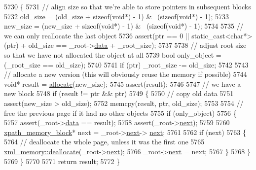 \begin{DoxyCode}
5730         \{
5731             \textcolor{comment}{// align size so that we're able to store pointers in subsequent blocks}
5732             old\_size = (old\_size + \textcolor{keyword}{sizeof}(\textcolor{keywordtype}{void}*) - 1) & ~(\textcolor{keyword}{sizeof}(\textcolor{keywordtype}{void}*) - 1);
5733             new\_size = (new\_size + \textcolor{keyword}{sizeof}(\textcolor{keywordtype}{void}*) - 1) & ~(\textcolor{keyword}{sizeof}(\textcolor{keywordtype}{void}*) - 1);
5734 
5735             \textcolor{comment}{// we can only reallocate the last object}
5736             assert(ptr == 0 || static\_cast<char*>(ptr) + old\_size == \_root->\hyperlink{structxpath__memory__block_a7b00376d0eac172ab537b6b0964858a9}{data} + \_root\_size);
5737 
5738             \textcolor{comment}{// adjust root size so that we have not allocated the object at all}
5739             \textcolor{keywordtype}{bool} only\_object = (\_root\_size == old\_size);
5740 
5741             \textcolor{keywordflow}{if} (ptr) \_root\_size -= old\_size;
5742 
5743             \textcolor{comment}{// allocate a new version (this will obviously reuse the memory if possible)}
5744             \textcolor{keywordtype}{void}* result = \hyperlink{classxpath__allocator_aad95aa445f2fdc7c3d1c19b1f3d67cb1}{allocate}(new\_size);
5745             assert(result);
5746 
5747             \textcolor{comment}{// we have a new block}
5748             \textcolor{keywordflow}{if} (result != ptr && ptr)
5749             \{
5750                 \textcolor{comment}{// copy old data}
5751                 assert(new\_size > old\_size);
5752                 memcpy(result, ptr, old\_size);
5753 
5754                 \textcolor{comment}{// free the previous page if it had no other objects}
5755                 \textcolor{keywordflow}{if} (only\_object)
5756                 \{
5757                     assert(\_root->\hyperlink{structxpath__memory__block_a7b00376d0eac172ab537b6b0964858a9}{data} == result);
5758                     assert(\_root->\hyperlink{structxpath__memory__block_ab7f0d8400b40a51cdb063e76fd19a93c}{next});
5759 
5760                     \hyperlink{structxpath__memory__block}{xpath\_memory\_block}* next = \_root->\hyperlink{structxpath__memory__block_ab7f0d8400b40a51cdb063e76fd19a93c}{next}->
      \hyperlink{structxpath__memory__block_ab7f0d8400b40a51cdb063e76fd19a93c}{next};
5761 
5762                     \textcolor{keywordflow}{if} (next)
5763                     \{
5764                         \textcolor{comment}{// deallocate the whole page, unless it was the first one}
5765                         \hyperlink{structxml__memory__management__function__storage_a1c80a9a045ed6cfb90b17a178e4b3512}{xml\_memory::deallocate}(\_root->\hyperlink{structxpath__memory__block_ab7f0d8400b40a51cdb063e76fd19a93c}{next});
5766                         \_root->\hyperlink{structxpath__memory__block_ab7f0d8400b40a51cdb063e76fd19a93c}{next} = next;
5767                     \}
5768                 \}
5769             \}
5770 
5771             \textcolor{keywordflow}{return} result;
5772         \}
\end{DoxyCode}
